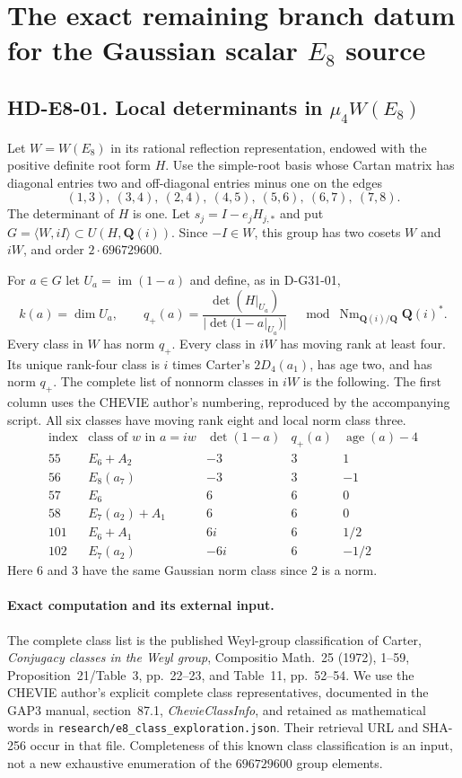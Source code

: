 \section{The exact remaining branch datum for the Gaussian scalar $E_8$ source}
\label{sec:e8-source-gate}

\subsection*{HD-E8-01. Local determinants in $\mu_4W(E_8)$}
Let $W=W(E_8)$ in its rational reflection representation, endowed
with the positive definite root form $H$. Use the simple-root basis
whose Cartan matrix has diagonal entries two and off-diagonal entries
minus one on the edges
\[
 (1,3),\ (3,4),\ (2,4),\ (4,5),\ (5,6),\ (6,7),\ (7,8).
\]
The determinant of $H$ is one. Let $s_j=I-e_jH_{j,*}$ and put
$G=\langle W,iI\rangle\subset U(H,\mathbf Q(i))$.
Since $-I\in W$, this group has two cosets $W$ and $iW$,
and order $2\cdot696729600$.

For $a\in G$ let $U_a=\operatorname{im}(1-a)$ and define, as in
D-G31-01,
\[
 k(a)=\dim U_a,\qquad
 q_+(a)=\frac{\det(H|_{U_a})}{|\det(1-a|_{U_a})|}
       \quad\bmod\operatorname{Nm}_{\mathbf Q(i)/\mathbf Q}\mathbf Q(i)^*.
\]
Every class in $W$ has norm $q_+$. Every class in $iW$ has moving
rank at least four. Its unique rank-four class is $i$ times Carter's
$2D_4(a_1)$, has age two, and has norm $q_+$. The complete list of
nonnorm classes in $iW$ is the following. The first column uses
the CHEVIE author's numbering, reproduced by the accompanying script.
All six classes have moving rank eight and local norm class three.
\[
\begin{array}{r|l|r|r|r}
\text{index}&\text{class of }w\text{ in }a=iw&
 \det(1-a)&q_+(a)&\operatorname{age}(a)-4\\\hline
55&E_6+A_2&-3&3&1\\
56&E_8(a_7)&-3&3&-1\\
57&E_6&6&6&0\\
58&E_7(a_2)+A_1&6&6&0\\
101&E_6+A_1&6i&6&1/2\\
102&E_7(a_2)&-6i&6&-1/2
\end{array}
\]
Here $6$ and $3$ have the same Gaussian norm class since $2$ is a norm.

\paragraph{Exact computation and its external input.}
The complete class list is the published Weyl-group classification
of Carter, \emph{Conjugacy classes in the Weyl group}, Compositio
Math.~25 (1972), 1--59, Proposition~21/Table~3, pp.~22--23, and
Table~11, pp.~52--54. We use the CHEVIE author's explicit complete
class representatives, documented in the GAP3 manual, section~87.1,
\emph{ChevieClassInfo}, and retained as mathematical words in
\texttt{research/e8\_class\_exploration.json}. Their retrieval URL
and SHA-256 occur in that file. Completeness of this known class
classification is an input, not a new exhaustive enumeration of
the $696729600$ group elements.

